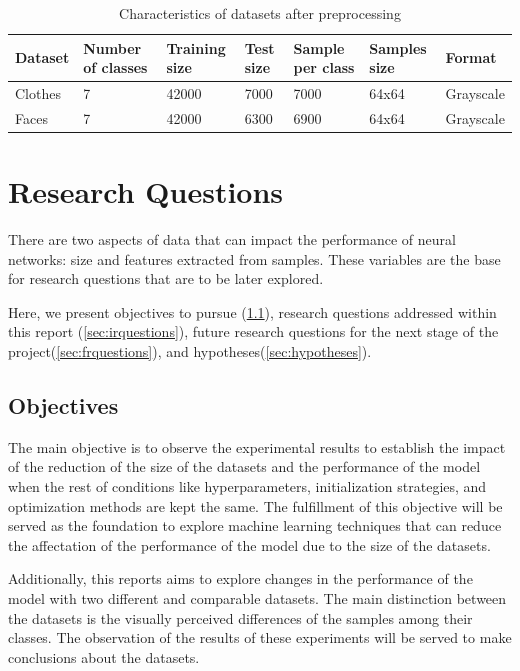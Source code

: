 \documentclass{article}
\begin{document}
 
\begin{table}[!htb]
  \centering
  \begin{tabular}{| l | l | l | l | l | l | l |}
    \hline
    \textbf{Dataset} & \textbf{Number of classes} & \textbf{Training size} & \textbf{Test size}  &  \textbf{Sample per class} & \textbf{Samples size} & \textbf{Format} \\ \hline
    Clothes & 7 & 42000 & 7000 & 7000 & 64x64 & Grayscale\\ \hline
    Faces & 7 & 42000 & 6300 & 6900 & 64x64 & Grayscale\\ \hline
  \end{tabular}
  \caption{Characteristics of datasets after preprocessing}
  \label{tab:1}
\end{table}


\section{Research Questions}
\label{sec:questions}

There are two aspects of data that can impact the performance of neural networks: size and features extracted from samples. These variables are the base for research questions that are to be later explored. 

Here, we present objectives to pursue (\ref{sec:objectives}), research questions addressed within this report (\ref{sec:irquestions}), future research questions for the next stage of the project(\ref{sec:frquestions}), and hypotheses(\ref{sec:hypotheses}).

\subsection{Objectives}
\label{sec:objectives}
The main objective is to observe the experimental results to establish the impact of the reduction of the size of the datasets and the performance of the model when the rest of conditions like hyperparameters, initialization strategies, and optimization methods are kept the same. The fulfillment of this objective will be served as the foundation to explore machine learning techniques that can reduce the affectation of the performance of the model due to the size of the datasets.

Additionally, this reports aims to explore changes in the performance of the model with two different and comparable datasets. The main distinction between the datasets is the visually perceived differences of the samples among their classes. The observation of the results of these experiments will be served to make conclusions about the datasets.
\end{document}
